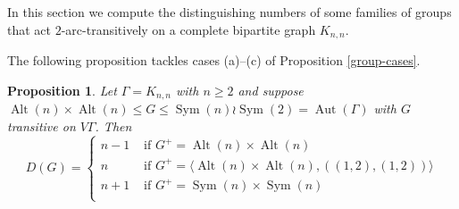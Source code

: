 \documentclass[11pt]{amsart}
\newtheorem{proposition}[theorem]{Proposition}
\DeclareMathOperator{\Sym}{Sym}
\DeclareMathOperator{\Alt}{Alt}
\DeclareMathOperator{\Aut}{Aut}
\begin{document}
In this section we compute the distinguishing numbers of some families of groups that act $2$-arc-transitively on a complete bipartite graph $K_{n,n}$. 

The following proposition tackles cases (a)--(c) of Proposition \ref{group-cases}.

\begin{proposition}\label{prop:notfaithful}
Let $\Gamma = K_{n, n}$ with $n\geqslant 2$ and suppose $\Alt(n)\times \Alt(n)\leqslant G \leqslant \Sym(n) \wr \Sym(2) = \Aut(\Gamma)$ with $G$ transitive on $V\Gamma$. Then 
$$D(G) =\begin{cases}
    n-1&\text{ if }G^+=\Alt(n)\times \Alt(n)\\
   n& \text{ if }G^+=\langle \Alt(n)\times \Alt(n),((1,2),(1,2))\rangle\\
    n+1&\text{ if }G^+=\Sym(n)\times \Sym(n)\\
\end{cases} $$
\end{proposition}
\end{document}

